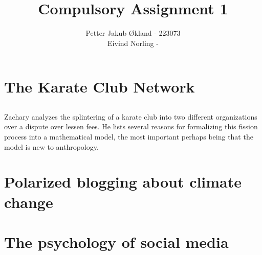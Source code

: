 \documentclass[11pt]{article}
\title{ Compulsory Assignment 1}
\author{ Petter Jakub Økland - 223073\\
Eivind Norling - }
\begin{document}
\maketitle

\section{The Karate Club Network}
\subsection{}
\subsection{}
Zachary analyzes the splintering of a karate club into two different organizations
over a dispute over lessen fees. He lists several reasons for formalizing this fission
process into a mathematical model, the most important perhaps being that the model is
new to anthropology.

\section{Polarized blogging about climate change}


\section{The psychology of social media}




\end{document}
